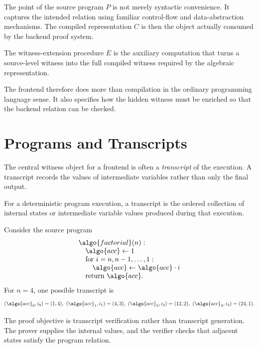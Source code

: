 \documentclass[11pt]{article}
\begin{document}
The point of the source program $P$ is not merely syntactic convenience.  It
captures the intended relation using familiar control-flow and data-abstraction
mechanisms.  The compiled representation $C$ is then the object actually
consumed by the backend proof system.

\begin{definition}
The witness-extension procedure $E$ is the auxiliary computation that turns a
source-level witness into the full compiled witness required by the algebraic
representation.
\end{definition}

The frontend therefore does more than compilation in the ordinary programming
language sense.  It also specifies how the hidden witness must be enriched so
that the backend relation can be checked.

\section{Programs and Transcripts}

The central witness object for a frontend is often a \emph{transcript} of the
execution.  A transcript records the values of intermediate variables rather
than only the final output.

\begin{definition}
For a deterministic program execution, a transcript is the ordered collection
of internal states or intermediate variable values produced during that
execution.
\end{definition}

Consider the source program
\[
\begin{array}{l}
\algo{factorial}(n): \\
\quad \algo{acc} \leftarrow 1 \\
\quad \text{for } i = n,n-1,\ldots,1: \\
\qquad \algo{acc} \leftarrow \algo{acc} \cdot i \\
\quad \text{return } \algo{acc}.
\end{array}
\]
For $n=4$, one possible transcript is
\[
  (\algo{acc}_0,i_0) = (1,4),\ 
  (\algo{acc}_1,i_1) = (4,3),\ 
  (\algo{acc}_2,i_2) = (12,2),\ 
  (\algo{acc}_3,i_3) = (24,1).
\]

\begin{remark}
The proof objective is transcript verification rather than transcript
generation.  The prover supplies the internal values, and the verifier checks
that adjacent states satisfy the program relation.
\end{remark}
\end{document}
